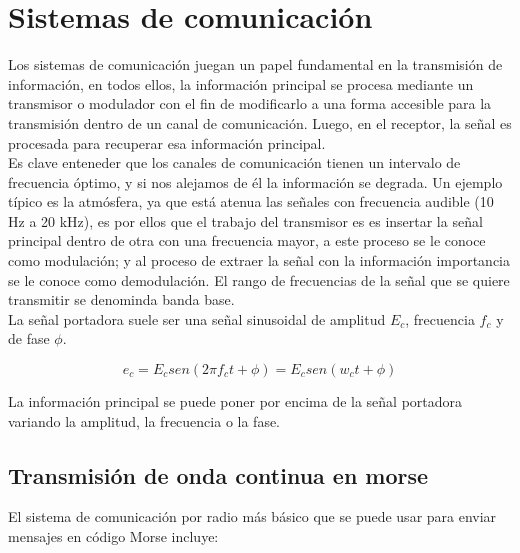 \chapter{Sistemas de comunicación}
\chapterspaceabove{6.75cm} %
\chapterspacebelow{7.25cm} %

Los sistemas de comunicación juegan un papel fundamental en la transmisión de información, en todos ellos, la información principal se procesa mediante un transmisor o modulador con el fin de modificarlo a una forma accesible para la transmisión dentro de un canal de comunicación. Luego, en el receptor, la señal es procesada para recuperar esa información principal.\\

Es clave enteneder que los canales de comunicación tienen un intervalo de frecuencia óptimo, y si nos alejamos de él la información se degrada. Un ejemplo típico es la atmósfera, ya que está atenua las señales con frecuencia audible (10 Hz a 20 kHz), es por ellos que el trabajo del transmisor es es insertar la señal principal dentro de otra con una frecuencia mayor, a este proceso se le conoce como modulación; y al proceso de extraer la señal con la información importancia se le conoce como demodulación. El rango de frecuencias de la señal que se quiere transmitir se denominda banda base.\\

La señal portadora suele ser una señal sinusoidal de amplitud \(E_{c}\), frecuencia \(f_{c}\) y de fase \(\phi\).\\

\begin{definicion}
\begin{equation}
e_{c} = E_{c} sen(2\pi f_{c} t + \phi) = E_{c} sen(w_{c}t + \phi)
\end{equation}
\end{definicion}

La información principal se puede poner por encima de la señal portadora variando la amplitud, la frecuencia o la fase.\\

\section{Transmisión de onda continua en morse}
El sistema de comunicación por radio más básico que se puede usar para enviar mensajes en código Morse incluye:\\

